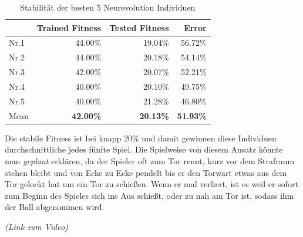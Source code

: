                 \begin{table}[H]
                    \begin{center}
                    \begin{tabular}{ |l|r|r|r| } 
                        \hline
                        \hfill & Trained Fitness   & Tested Fitness  &          Error    \\ \hline
                          Nr.1 &          44.00\%  &         19.04\% &          56.72\%  \\  
                          Nr.2 &          44.00\%  &         20.18\% &          54.14\%  \\  
                          Nr.3 &          42.00\%  &         20.07\% &          52.21\%  \\ 
                          Nr.4 &          40.00\%  &         20.10\% &          49.75\%  \\ 
                          Nr.5 &          40.00\%  &         21.28\% &          46.80\%  \\ \hline
                          Mean &  \textbf{42.00\%} & \textbf{20.13\%} & \textbf{51.93\%}  \\ \hline
                    \end{tabular}
                    \end{center}
                    \caption{Stabilität der besten 5 Neurevolution Individuen \label{fig:neuroevotable}}
                \end{table}

                \noindent
                Die stabile Fitness ist bei knapp 20\% und damit gewinnen diese Individuen durchschnittliche jedes fünfte Spiel. Die Spielweise von diesem Ansatz könnte man \textit{geplant} erklären, da der Spieler oft zum Tor rennt, kurz vor dem Strafraum stehen bleibt und von Ecke zu Ecke pendelt bis er den Torwart etwas aus dem Tor gelockt hat um ein Tor zu schießen. Wenn er mal verliert, ist es weil er sofort zum Beginn des Spieles sich ins Aus schießt, oder zu nah am Tor ist, sodass ihm der Ball abgenommen wird.\\

                \begin{center} \textit{(Link zum Video)} \end{center}
\newpage
